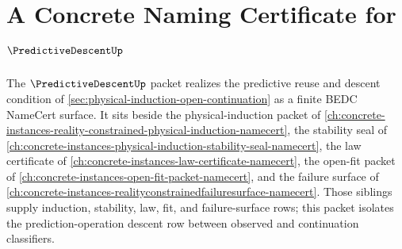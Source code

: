 \chapter{A Concrete Naming Certificate for $\PredictiveDescentUp$}
\label{ch:concrete-instances-predictive-descent-namecert}

The $\PredictiveDescentUp$ packet realizes the predictive reuse and descent condition of \autoref{sec:physical-induction-open-continuation} as a finite BEDC NameCert surface. It sits beside the physical-induction packet of \autoref{ch:concrete-instances-reality-constrained-physical-induction-namecert}, the stability seal of \autoref{ch:concrete-instances-physical-induction-stability-seal-namecert}, the law certificate of \autoref{ch:concrete-instances-law-certificate-namecert}, the open-fit packet of \autoref{ch:concrete-instances-open-fit-packet-namecert}, and the failure surface of \autoref{ch:concrete-instances-realityconstrainedfailuresurface-namecert}. Those siblings supply induction, stability, law, fit, and failure-surface rows; this packet isolates the prediction-operation descent row between observed and continuation classifiers.

